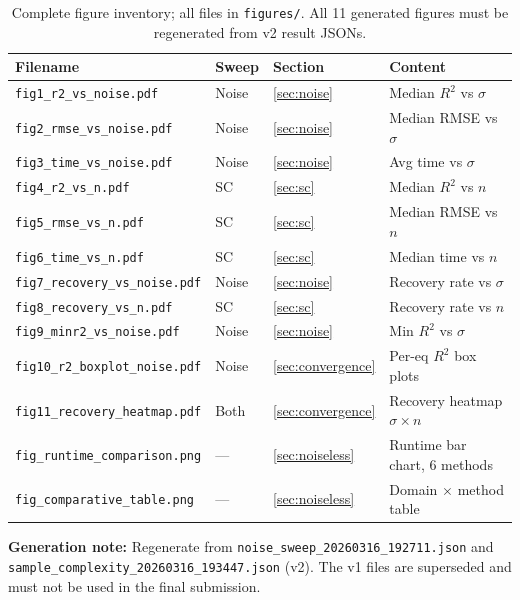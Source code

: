 \documentclass[twoside,11pt]{article}
\newcommand{\Rsq}{R^{2}}
\begin{document}
\begin{table}[H]
\centering
\caption{Complete figure inventory; all files in \texttt{figures/}.
  All 11 generated figures must be regenerated from v2 result JSONs.}
\label{tab:figlist}
\small
\renewcommand{\arraystretch}{1.25}
\begin{tabular}{L{4.8cm} L{1.5cm} L{1.8cm} L{3.2cm}}
\toprule
\textbf{Filename} & \textbf{Sweep} & \textbf{Section} & \textbf{Content}\\
\midrule
\texttt{fig1\_r2\_vs\_noise.pdf}       & Noise & \ref{sec:noise}        & Median $\Rsq$ vs $\sigma$\\
\texttt{fig2\_rmse\_vs\_noise.pdf}     & Noise & \ref{sec:noise}        & Median RMSE vs $\sigma$\\
\texttt{fig3\_time\_vs\_noise.pdf}     & Noise & \ref{sec:noise}        & Avg time vs $\sigma$\\
\texttt{fig4\_r2\_vs\_n.pdf}           & SC    & \ref{sec:sc}           & Median $\Rsq$ vs $n$\\
\texttt{fig5\_rmse\_vs\_n.pdf}         & SC    & \ref{sec:sc}           & Median RMSE vs $n$\\
\texttt{fig6\_time\_vs\_n.pdf}         & SC    & \ref{sec:sc}           & Median time vs $n$\\
\texttt{fig7\_recovery\_vs\_noise.pdf} & Noise & \ref{sec:noise}        & Recovery rate vs $\sigma$\\
\texttt{fig8\_recovery\_vs\_n.pdf}     & SC    & \ref{sec:sc}           & Recovery rate vs $n$\\
\texttt{fig9\_minr2\_vs\_noise.pdf}    & Noise & \ref{sec:noise}        & Min $\Rsq$ vs $\sigma$\\
\texttt{fig10\_r2\_boxplot\_noise.pdf} & Noise & \ref{sec:convergence}  & Per-eq $\Rsq$ box plots\\
\texttt{fig11\_recovery\_heatmap.pdf}  & Both  & \ref{sec:convergence}  & Recovery heatmap $\sigma \times n$\\
\midrule
\texttt{fig\_runtime\_comparison.png}  & ---   & \ref{sec:noiseless}    & Runtime bar chart, 6 methods\\
\texttt{fig\_comparative\_table.png}   & ---   & \ref{sec:noiseless}    & Domain $\times$ method table\\
\bottomrule
\end{tabular}
\end{table}

\noindent\textbf{Generation note:} Regenerate from
\texttt{noise\_sweep\_20260316\_192711.json} and
\texttt{sample\_complexity\_20260316\_193447.json} (v2).
The v1 files are superseded and must not be used in the final submission.
\end{document}
